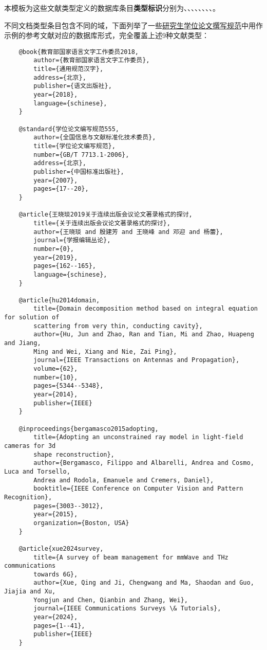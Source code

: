 \documentclass[print, doctor, vlined]{DissertUESTC}
\begin{document}
	本模板为这些文献类型定义的数据库条目\textbf{类型标识}分别为、、、、、、、、。
	
	不同文档类型条目包含不同的域，下面列举了一些\href{https://gr.uestc.edu.cn/xiazai/114/3917}{研究生学位论文撰写规范}中用作示例的参考文献对应的数据库形式，完全覆盖上述9种文献类型：
	
	\begin{verbatim}
	@book{教育部国家语言文字工作委员2018,
	    author={教育部国家语言文字工作委员},
	    title={通用规范汉字},
	    address={北京},
	    publisher={语文出版社},
	    year={2018},
	    language={schinese},
	}
	
	@standard{学位论文编写规范555,
	    author={全国信息与文献标准化技术委员},
	    title={学位论文编写规范},
	    number={GB/T 7713.1-2006},
	    address={北京},
	    publisher={中国标准出版社},
	    year={2007},
	    pages={17--20},
	}
	
	@article{王晓琰2019关于连续出版会议论文著录格式的探讨,
	    title={关于连续出版会议论文著录格式的探讨},
	    author={王晓琰 and 殷建芳 and 王晓峰 and 邓迎 and 杨蕾},
	    journal={学报编辑丛论},
	    number={0},
	    year={2019},
	    pages={162--165},
	    language={schinese},
	}
	
	@article{hu2014domain,
	    title={Domain decomposition method based on integral equation for solution of
	    scattering from very thin, conducting cavity},
	    author={Hu, Jun and Zhao, Ran and Tian, Mi and Zhao, Huapeng and Jiang,
	    Ming and Wei, Xiang and Nie, Zai Ping},
	    journal={IEEE Transactions on Antennas and Propagation},
	    volume={62},
	    number={10},
	    pages={5344--5348},
	    year={2014},
	    publisher={IEEE}
	}
	
	@inproceedings{bergamasco2015adopting,
	    title={Adopting an unconstrained ray model in light-field cameras for 3d
	    shape reconstruction},
	    author={Bergamasco, Filippo and Albarelli, Andrea and Cosmo, Luca and Torsello,
	    Andrea and Rodola, Emanuele and Cremers, Daniel},
	    booktitle={IEEE Conference on Computer Vision and Pattern Recognition},
	    pages={3003--3012},
	    year={2015},
	    organization={Boston, USA}
	}
	
	@article{xue2024survey,
	    title={A survey of beam management for mmWave and THz communications
	    towards 6G},
	    author={Xue, Qing and Ji, Chengwang and Ma, Shaodan and Guo, Jiajia and Xu,
	    Yongjun and Chen, Qianbin and Zhang, Wei},
	    journal={IEEE Communications Surveys \& Tutorials},
	    year={2024},
	    pages={1--41},
	    publisher={IEEE}
	}
	

\end{verbatim}
\end{document}
